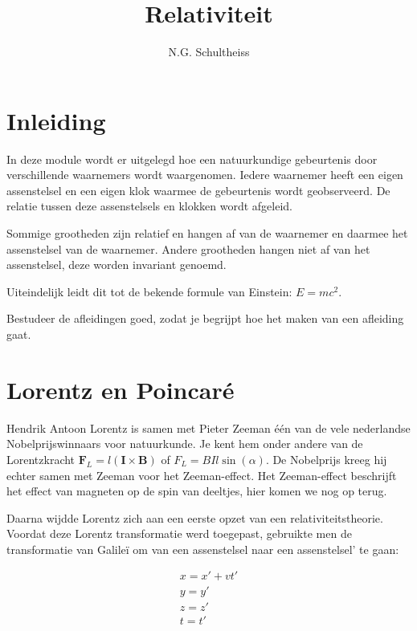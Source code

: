 



\title{Relativiteit}
\author{N.G. Schultheiss}
\date{}

\maketitle
\thispagestyle{firststyle}

\section{Inleiding}

In deze module wordt er uitgelegd hoe een natuurkundige gebeurtenis
door verschillende waarnemers wordt waargenomen. Iedere waarnemer
heeft een eigen assenstelsel en een eigen klok waarmee de gebeurtenis
wordt geobserveerd. De relatie tussen deze assenstelsels en klokken
wordt afgeleid.

Sommige grootheden zijn relatief en hangen af van de waarnemer en
daarmee het assenstelsel van de waarnemer. Andere grootheden hangen
niet af van het assenstelsel, deze worden invariant genoemd.

Uiteindelijk leidt dit tot de bekende formule van Einstein: $E=mc^{2}$.

Bestudeer de afleidingen goed, zodat je begrijpt hoe het maken van
een afleiding gaat.


\section{Lorentz en Poincaré}

Hendrik Antoon Lorentz is samen met Pieter Zeeman één van de vele
nederlandse Nobelprijswinnaars voor na\-tuur\-kunde. Je kent hem
onder andere van de Lorentzkracht $\mathbf{F}_{L}=l(\mathbf{I}\times\mathbf{B})$
of $F_{L}=BIl\sin(\alpha)$. De Nobelprijs kreeg hij echter samen met
Zeeman voor het Zeeman-effect. Het Zeeman-effect beschrijft het effect
van magneten op de spin van deeltjes, hier komen we nog op terug.

Daarna wijdde Lorentz zich aan een eerste opzet van een relativiteitstheorie.
Voordat deze Lorentz transformatie werd toegepast, gebruikte men de
transformatie van Galileï om van een assenstelsel naar een assenstelsel'
te gaan:

\begin{equation}
\begin{array}{c}
x=x'+vt'\\
y=y'\\
z=z'\\
t=t'
\end{array}
\end{equation}


